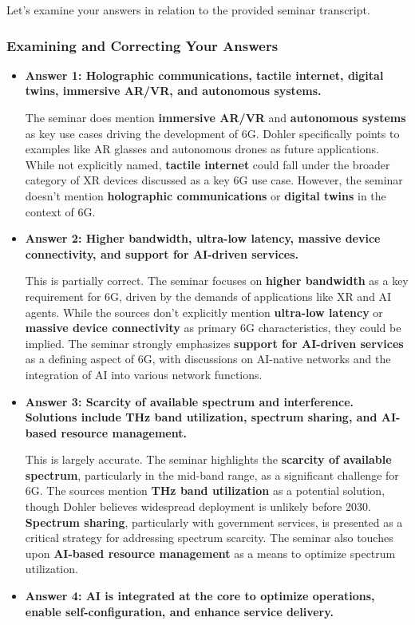 \documentclass[
]{article}
\author{}
\date{}
\begin{document}
Let's examine your answers in relation to the provided seminar
transcript.

\subsubsection{Examining and Correcting Your
Answers}\label{examining-and-correcting-your-answers}

\begin{itemize}
\item
  \textbf{Answer 1: Holographic communications, tactile internet,
  digital twins, immersive AR/VR, and autonomous systems.}

  The seminar does mention \textbf{immersive AR/VR} and
  \textbf{autonomous systems} as key use cases driving the development
  of 6G. Dohler specifically points to examples like AR glasses and
  autonomous drones as future applications. While not explicitly named,
  \textbf{tactile internet} could fall under the broader category of XR
  devices discussed as a key 6G use case. However, the seminar doesn't
  mention \textbf{holographic communications} or \textbf{digital twins}
  in the context of 6G.
\item
  \textbf{Answer 2: Higher bandwidth, ultra-low latency, massive device
  connectivity, and support for AI-driven services.}

  This is partially correct. The seminar focuses on \textbf{higher
  bandwidth} as a key requirement for 6G, driven by the demands of
  applications like XR and AI agents. While the sources don't explicitly
  mention \textbf{ultra-low latency} or \textbf{massive device
  connectivity} as primary 6G characteristics, they could be implied.
  The seminar strongly emphasizes \textbf{support for AI-driven
  services} as a defining aspect of 6G, with discussions on AI-native
  networks and the integration of AI into various network functions.
\item
  \textbf{Answer 3: Scarcity of available spectrum and interference.
  Solutions include THz band utilization, spectrum sharing, and AI-based
  resource management.}

  This is largely accurate. The seminar highlights the \textbf{scarcity
  of available spectrum}, particularly in the mid-band range, as a
  significant challenge for 6G. The sources mention \textbf{THz band
  utilization} as a potential solution, though Dohler believes
  widespread deployment is unlikely before 2030. \textbf{Spectrum
  sharing}, particularly with government services, is presented as a
  critical strategy for addressing spectrum scarcity. The seminar also
  touches upon \textbf{AI-based resource management} as a means to
  optimize spectrum utilization.
\item
  \textbf{Answer 4: AI is integrated at the core to optimize operations,
  enable self-configuration, and enhance service delivery.}


\end{itemize}
\end{document}
